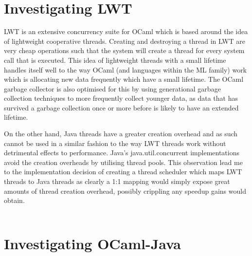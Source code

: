 \documentclass[12pt,twoside,notitlepage]{report}
\begin{document}
\section{Investigating LWT}
\label{sec:investigating_lwt}
%
%
LWT is an extensive concurrency suite for OCaml which is based around the idea of lightweight cooperative threads\cite{dimino2012}. Creating and destroying a thread in LWT are very cheap operations such that the system will create a
thread for every system call that is executed. This idea of lightweight threads with a small lifetime handles itself well to the way OCaml (and languages within the ML family) work which is allocating new data frequently which have a
small lifetime. The OCaml garbage collector is also optimised for this by using generational garbage collection techniques to more frequently collect younger data, as data that has survived a garbage collection once or more before is
likely to have an extended lifetime.\cite{chailloux2000}

On the other hand, Java threads have a greater creation overhead and as such cannot be used in a similar fashion to the way LWT threads work without detrimental effects to performance. Java's java.util.concurrent implementations avoid
the creation overheads by utilising thread pools\cite{web:threadpools}. This observation lead me to the implementation decision of creating a thread scheduler which maps LWT threads to Java threads as clearly a 1:1 mapping would
simply expose great amounts of thread creation overhead, possibly crippling any speedup gains would obtain.
\\
\\
%
%

\section{Investigating OCaml-Java}
\label{sec:investigating_ocaml-java}
\end{document}
